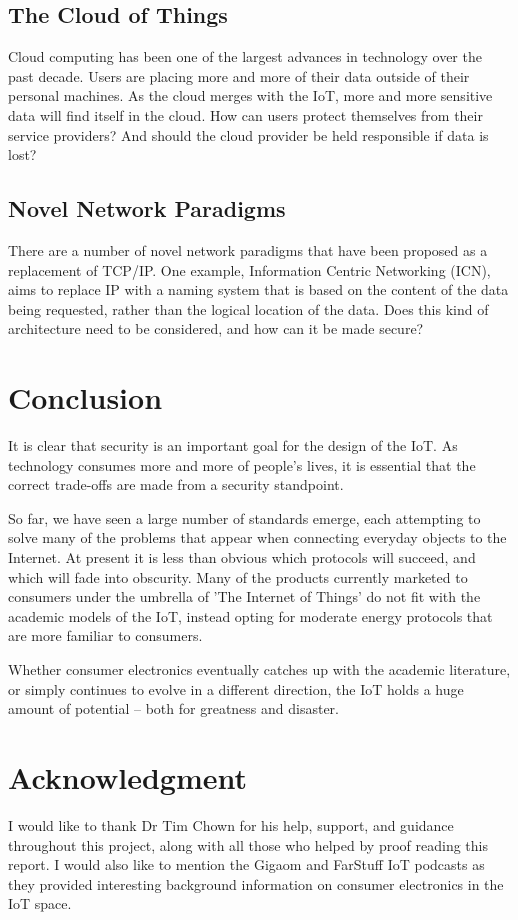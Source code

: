 \documentclass[10pt,journal,compsoc]{IEEEtran}
\begin{document}
\subsection{The Cloud of Things}
Cloud computing has been one of the largest advances in technology over the
past decade. Users are placing more and more of their data outside of their
personal machines. As the cloud merges with the IoT, more and more sensitive
data will find itself in the cloud. How can users protect themselves from their
service providers? And should the cloud provider be held responsible if data is
lost?

\subsection{Novel Network Paradigms}
There are a number of novel network paradigms that have been proposed as a
replacement of TCP/IP. One example, Information Centric Networking (ICN), aims
to replace IP with a naming system that is based on the content of the data
being requested, rather than the logical location of the data. Does this kind of
architecture need to be considered, and how can it be made secure?


\section{Conclusion}
It is clear that security is an important goal for the design of the IoT. As
technology consumes more and more of people's lives, it is essential that the
correct trade-offs are made from a security standpoint. 

So far, we have seen a large number of standards emerge, each attempting to
solve many of the problems that appear when connecting everyday objects to the
Internet. At present it is less than obvious which protocols will succeed, and
which will fade into obscurity. Many of the products currently marketed to
consumers under the umbrella of 'The Internet of Things' do not fit with the
academic models of the IoT, instead opting for moderate energy protocols that
are more familiar to consumers. 

Whether consumer electronics eventually catches up with the academic
literature, or simply continues to evolve in a different direction, the IoT
holds a huge amount of potential -- both for greatness and disaster.  


\section*{Acknowledgment}
I would like to thank Dr Tim Chown for his help, support, and guidance
throughout this project, along with all those who helped by proof reading this
report. I would also like to mention the Gigaom and FarStuff IoT podcasts as
they provided interesting background information on consumer electronics in the
IoT space. 
\end{document}
